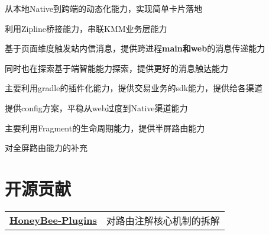 \documentclass[]{deedy-resume-openfont}
\begin{document}
\begin{minipage}[t]{0.73\textwidth}
\vspace{0.1em}
\vspace{0.1em}
\begin{tightemize}
    \item 从本地Native到跨端的动态化能力，实现简单卡片落地
    \item 利用Zipline桥接能力，串联KMM业务层能力
    \end{tightemize}
\sectionsep

\vspace{0.1em}
\vspace{0.1em}
\begin{tightemize}
    \item 基于页面维度触发站内信消息，提供跨进程\textbf{main和web}的消息传递能力
    \item 同时也在探索基于端智能能力探索，提供更好的消息触达能力
    \end{tightemize}
\sectionsep

\vspace{0.1em}
\vspace{0.1em}
\begin{tightemize}
    \item 主要利用gradle的插件化能力，提供交易业务的sdk能力，提供给各渠道
    \item 提供config方案，平稳从web过度到Native渠道能力
    \end{tightemize}
\sectionsep

\vspace{0.1em}
\vspace{0.1em}
\begin{tightemize}
    \item 主要利用Fragment的生命周期能力，提供半屏路由能力
    \item 对全屏路由能力的补充
    \end{tightemize}
\sectionsep



\section{开源贡献}
\begin{tabular}{ll}
\href{https://github.com/Catheryan/HoneyBee-Plugins}{\bf HoneyBee-Plugins} & 对路由注解核心机制的拆解 \\
\end{tabular}
\sectionsep


\end{minipage}
\end{document}
